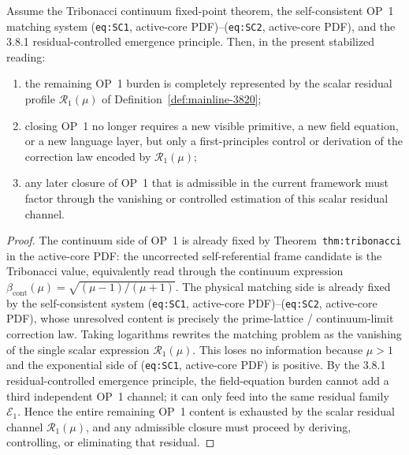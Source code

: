 \begin{theorem}
\label{thm:mainline-3820}
Assume the Tribonacci continuum fixed-point theorem, the self-consistent OP~1 matching system (\texttt{eq:SC1}, active-core PDF)--(\texttt{eq:SC2}, active-core PDF), and the 3.8.1 residual-controlled emergence principle. Then, in the present stabilized reading:
\begin{enumerate}[label=(\roman*), leftmargin=2em]
  \item the remaining OP~1 burden is completely represented by the scalar residual profile \(\mathcal R_{1}(\mu)\) of Definition~\ref{def:mainline-3820};
  \item closing OP~1 no longer requires a new visible primitive, a new field equation, or a new language layer, but only a first-principles control or derivation of the correction law encoded by \(\mathcal R_{1}(\mu)\);
  \item any later closure of OP~1 that is admissible in the current framework must factor through the vanishing or controlled estimation of this scalar residual channel.
\end{enumerate}
\end{theorem}

\begin{proof}
The continuum side of OP~1 is already fixed by Theorem~\texttt{thm:tribonacci} in the active-core PDF: the uncorrected self-referential frame candidate is the Tribonacci value, equivalently read through the continuum expression \(\beta_{\mathrm{cont}}(\mu)=\sqrt{(\mu-1)/(\mu+1)}\). The physical matching side is already fixed by the self-consistent system (\texttt{eq:SC1}, active-core PDF)--(\texttt{eq:SC2}, active-core PDF), whose unresolved content is precisely the prime-lattice / continuum-limit correction law. Taking logarithms rewrites the matching problem as the vanishing of the single scalar expression \(\mathcal R_{1}(\mu)\). This loses no information because \(\mu>1\) and the exponential side of (\texttt{eq:SC1}, active-core PDF) is positive. By the 3.8.1 residual-controlled emergence principle, the field-equation burden cannot add a third independent OP~1 channel; it can only feed into the same residual family \(\mathcal E_{1}\). Hence the entire remaining OP~1 content is exhausted by the scalar residual channel \(\mathcal R_{1}(\mu)\), and any admissible closure must proceed by deriving, controlling, or eliminating that residual.
\end{proof}

